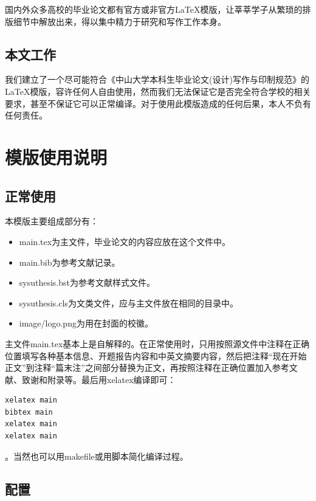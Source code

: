 ﻿\documentclass{sysuthesis}
\begin{document}
国内外众多高校的毕业论文都有官方或非官方\LaTeX 模版，让莘莘学子从繁琐的排版细节中解放出来，得以集中精力于研究和写作工作本身。 

\section{本文工作}

我们建立了一个尽可能符合《中山大学本科生毕业论文(设计)写作与印制规范》的\LaTeX 模版，容许任何人自由使用，然而我们无法保证它是否完全符合学校的相关要求，甚至不保证它可以正常编译。对于使用此模版造成的任何后果，本人不负有任何责任。

\chapter{模版使用说明}

\section{正常使用}

本模版主要组成部分有：

\begin{itemize}
	\item {\ttfamily main.tex}为主文件，毕业论文的内容应放在这个文件中。
	\item {\ttfamily main.bib}为参考文献记录。
	\item {\ttfamily sysuthesis.bst}为参考文献样式文件。
	\item {\ttfamily sysuthesis.cls}为文类文件，应与主文件放在相同的目录中。
	\item {\ttfamily image/logo.png}为用在封面的校徽。
\end{itemize}

主文件{\ttfamily main.tex}基本上是自解释的。在正常使用时，只用按照源文件中注释在正确位置填写各种基本信息、开题报告内容和中英文摘要内容，然后把注释``现在开始正文''到注释``篇末注''之间部分替换为正文，再按照注释在正确位置加入参考文献、致谢和附录等。最后用{\ttfamily xelatex}编译即可：

\begin{lstlisting}[language=bash, keywordstyle=\color{blue}\bfseries, basicstyle=\ttfamily, breaklines=true, frame=shadowbox]
xelatex main
bibtex main
xelatex main
xelatex main
\end{lstlisting}
。当然也可以用{\ttfamily makefile}或用脚本简化编译过程。

\section{配置}
\end{document}
